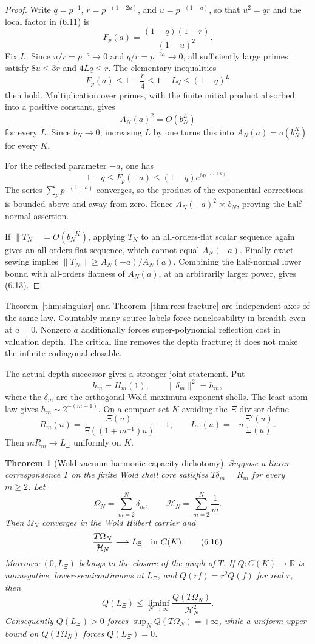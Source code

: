 \documentclass[11pt]{article}
\newtheorem{theorem}{Theorem}[section]
\theoremstyle{definition}
\theoremstyle{remark}
\newcommand{\R}{\mathbb R}
\begin{document}
\begin{proof}
Write $q=p^{-1}$, $r=p^{-(1-2a)}$, and $u=p^{-(1-a)}$, so that $u^2=qr$ and the local factor in
(6.11) is
\[
 F_p(a)=\frac{(1-q)(1-r)}{(1-u)^2}.
\]
Fix $L$.  Since $u/r=p^{-a}\to0$ and $q/r=p^{-2a}\to0$, all sufficiently large primes satisfy
$8u\leq3r$ and $4Lq\leq r$.  The elementary inequalities
\[
 F_p(a)\leq1-\frac r4\leq1-Lq\leq(1-q)^L
\]
then hold.  Multiplication over primes, with the finite initial product absorbed into a positive
constant, gives
\[
 A_N(a)^2=O(b_N^L)
\]
for every $L$.  Since $b_N\to0$, increasing $L$ by one turns this into
$A_N(a)=o(b_N^K)$ for every $K$.

For the reflected parameter $-a$, one has
\[
 1-q\leq F_p(-a)\leq(1-q)e^{6p^{-(1+a)}}.
\]
The series $\sum_p p^{-(1+a)}$ converges, so the product of the exponential corrections is bounded
above and away from zero.  Hence $A_N(-a)^2\asymp b_N$, proving the half-normal assertion.

If $\|T_N\|=O(b_N^{-K})$, applying $T_N$ to an all-orders-flat scalar sequence again gives an
all-orders-flat sequence, which cannot equal $A_N(-a)$.  Finally exact sewing implies
$\|T_N\|\geq A_N(-a)/A_N(a)$.  Combining the half-normal lower bound with all-orders flatness of
$A_N(a)$, at an arbitrarily larger power, gives (6.13).
\end{proof}

Theorem~\ref{thm:singular} and Theorem~\ref{thm:rees-fracture} are independent axes of the same
law.  Countably many source labels force nonclosability in breadth even at $a=0$.
Nonzero $a$ additionally forces super-polynomial reflection cost in valuation depth.  The
critical line removes the depth fracture; it does not make the infinite codiagonal closable.

The actual depth successor gives a stronger joint statement.  Put
\[
 h_m=H_m(1),\qquad \|\delta_m\|^2=h_m,
\]
where the $\delta_m$ are the orthogonal Wold maximum-exponent shells.  The least-atom law gives
$h_m\sim2^{-(m+1)}$.  On a compact set $K$ avoiding the $\Xi$ divisor define
\[
 R_m(u)=\frac{\Xi(u)}{\Xi((1+m^{-1})u)}-1,\qquad
 L_\Xi(u)=-u\frac{\Xi'(u)}{\Xi(u)}.
\tag{6.14}
\]
Then $mR_m\to L_\Xi$ uniformly on $K$.

\begin{theorem}[Wold-vacuum harmonic capacity dichotomy]
\label{thm:wold-vacuum-capacity}
Suppose a linear correspondence $T$ on the finite Wold shell core satisfies
$T\delta_m=R_m$ for every $m\geq2$.  Let
\[
 \Omega_N=\sum_{m=2}^N\delta_m,\qquad
 {\mathcal H}_N=\sum_{m=2}^N\frac1m.
\tag{6.15}
\]
Then $\Omega_N$ converges in the Wold Hilbert carrier and
\[
 \frac{T\Omega_N}{{\mathcal H}_N}\longrightarrow L_\Xi
 \quad\hbox{in }C(K).
\tag{6.16}
\]
Moreover $(0,L_\Xi)$ belongs to the closure of the graph of $T$.  If
$Q:C(K)\to\R$ is nonnegative, lower-semicontinuous at $L_\Xi$, and
$Q(rf)=r^2Q(f)$ for real $r$, then
\[
 Q(L_\Xi)
 \leq\liminf_{N\to\infty}\frac{Q(T\Omega_N)}{{\mathcal H}_N^2}.
\tag{6.17}
\]
Consequently $Q(L_\Xi)>0$ forces $\sup_NQ(T\Omega_N)=+\infty$, while a uniform
upper bound on $Q(T\Omega_N)$ forces $Q(L_\Xi)=0$.
\end{theorem}
\end{document}
